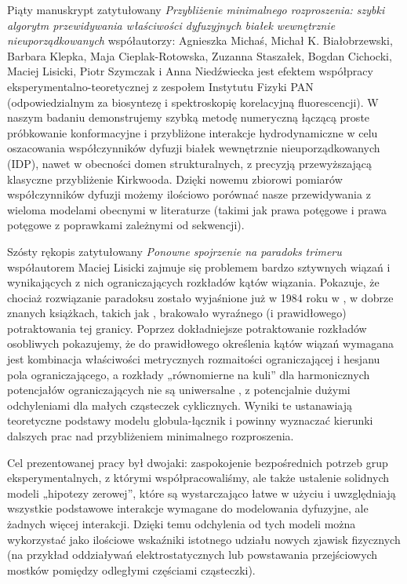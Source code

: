 {    Piąty manuskrypt zatytułowany \emph{Przybliżenie minimalnego rozproszenia: szybki algorytm przewidywania właściwości dyfuzyjnych białek wewnętrznie nieuporządkowanych} współautorzy: Agnieszka Michaś, Michał K.
    Białobrzewski, Barbara Klepka, Maja Cieplak-Rotowska, Zuzanna Staszałek, Bogdan Cichocki, Maciej Lisicki, Piotr Szymczak i Anna Niedźwiecka jest efektem współpracy eksperymentalno-teoretycznej z zespołem Instytutu Fizyki PAN (odpowiedzialnym za biosyntezę i spektroskopię korelacyjną fluorescencji).
    W naszym badaniu demonstrujemy szybką metodę numeryczną łączącą proste próbkowanie konformacyjne i przybliżone interakcje hydrodynamiczne w celu oszacowania współczynników dyfuzji białek wewnętrznie nieuporządkowanych (IDP), nawet w obecności domen strukturalnych, z precyzją przewyższającą klasyczne przybliżenie Kirkwooda.
    Dzięki nowemu zbiorowi pomiarów współczynników dyfuzji możemy ilościowo porównać nasze przewidywania z wieloma modelami obecnymi w literaturze (takimi jak prawa potęgowe i prawa potęgowe z poprawkami zależnymi od sekwencji).

    Szósty rękopis zatytułowany \emph{Ponowne spojrzenie na paradoks trimeru} współautorem Maciej Lisicki zajmuje się problemem bardzo sztywnych wiązań i wynikających z nich ograniczających rozkładów kątów wiązania.
    Pokazuje, że chociaż rozwiązanie paradoksu zostało wyjaśnione już w 1984 roku w \textcite{van_Kampen_1984}, w dobrze znanych książkach, takich jak \textcite{Frenkel_2002}, brakowało wyraźnego (i prawidłowego) potraktowania tej granicy.
    Poprzez dokładniejsze potraktowanie rozkładów osobliwych pokazujemy, że do prawidłowego określenia kątów wiązań wymagana jest kombinacja właściwości metrycznych rozmaitości ograniczającej i hesjanu pola ograniczającego, a rozkłady „równomierne na kuli” dla harmonicznych potencjałów ograniczających nie są uniwersalne , z potencjalnie dużymi odchyleniami dla małych cząsteczek cyklicznych.
    Wyniki te ustanawiają teoretyczne podstawy modelu globula-łącznik i powinny wyznaczać kierunki dalszych prac nad przybliżeniem minimalnego rozproszenia.

    Cel prezentowanej pracy był dwojaki: zaspokojenie bezpośrednich potrzeb grup eksperymentalnych, z którymi współpracowaliśmy, ale także ustalenie solidnych modeli „hipotezy zerowej”, które są wystarczająco łatwe w użyciu i uwzględniają wszystkie podstawowe interakcje wymagane do modelowania dyfuzyjne, ale żadnych więcej interakcji.
    Dzięki temu odchylenia od tych modeli można wykorzystać jako ilościowe wskaźniki istotnego udziału nowych zjawisk fizycznych (na przykład oddziaływań elektrostatycznych lub powstawania przejściowych mostków pomiędzy odległymi częściami cząsteczki).
}